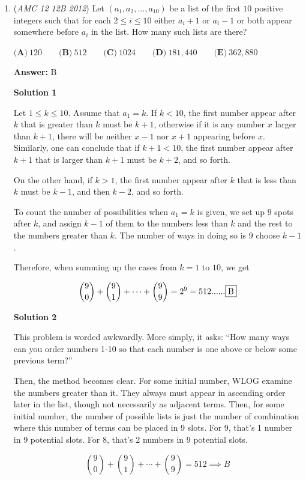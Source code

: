 \begin{enumerate}
	\item (\textit{AMC 12 12B 2012}) Let $(a_1,a_2, \dots ,a_{10})$ be a list of the first $10$ positive integers such that for each $2 \le i \le 10$ either $a_i+1$ or $a_i-1$ or both appear somewhere before $a_i$ in the list. How many such lists are there?


 $\textbf{(A)}\ 120\qquad\textbf{(B)}\ 512\qquad\textbf{(C)}\ 1024\qquad\textbf{(D)}\ 181,440\qquad\textbf{(E)}\ 362,880$

 \textbf{Answer: }B



\textbf{Solution 1}

Let $1\leq k\leq 10$. Assume that $a_1=k$. If $k<10$, the first number appear after $k$ that is greater than $k$ must be $k+1$, otherwise if it is any number $x$ larger than $k+1$, there will be neither $x-1$ nor $x+1$ appearing before $x$. Similarly, one can conclude that if $k+1<10$, the first number appear after $k+1$ that is larger than $k+1$ must be $k+2$, and so forth.

 On the other hand, if $k>1$, the first number appear after $k$ that is less than $k$ must be $k-1$, and then $k-2$, and so forth.

 To count the number of possibilities when $a_1=k$ is given, we set up $9$ spots after $k$, and assign $k-1$ of them to the numbers less than $k$ and the rest to the numbers greater than $k$. The number of ways in doing so is $9$ choose $k-1$.

 Therefore, when summing up the cases from $k=1$ to $10$, we get

 
 \[\binom{9}{0} + \binom{9}{1} + \cdots + \binom{9}{9} = 2^9=512 ...... \framebox{B}\]




\textbf{Solution 2}

This problem is worded awkwardly. More simply, it asks: “How many ways can you order numbers 1-10 so that each number is one above or below some previous term?”

 
Then, the method becomes clear. For some initial number, WLOG examine the numbers greater than it. They always must appear in ascending order later in the list, though not necessarily as adjacent terms. Then, for some initial number, the number of possible lists is just the number of combination where this number of terms can be placed in 9 slots. For 9, that’s 1 number in 9 potential slots. For 8, that’s 2 numbers in 9 potential slots. 

 
 \[\binom{9}{0} + \binom{9}{1} + \cdots + \binom{9}{9} =512 \implies \boxed{B}\]





\end{enumerate}
